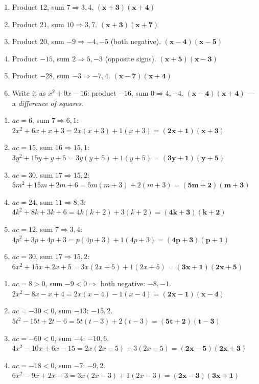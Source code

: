 \documentclass[11pt]{article}
\begin{document}
\begin{anskey}[title={Practice B --- Factoring when $a = 1$}]
\begin{enumerate}[label=\textbf{\arabic*.},leftmargin=2em,itemsep=4pt]
\item Product $12$, sum $7 \Rightarrow 3,4$. \quad $\mathbf{(x+3)(x+4)}$
\item Product $21$, sum $10 \Rightarrow 3,7$. \quad $\mathbf{(x+3)(x+7)}$
\item Product $20$, sum $-9 \Rightarrow -4,-5$ (both negative). \quad $\mathbf{(x-4)(x-5)}$
\item Product $-15$, sum $2 \Rightarrow 5,-3$ (opposite signs). \quad $\mathbf{(x+5)(x-3)}$
\item Product $-28$, sum $-3 \Rightarrow -7,4$. \quad $\mathbf{(x-7)(x+4)}$
\item Write it as $x^2 + 0x - 16$: product $-16$, sum $0 \Rightarrow 4,-4$.
\quad $\mathbf{(x-4)(x+4)}$ --- a \emph{difference of squares}.
\end{enumerate}
\end{anskey}

\begin{anskey}[title={Practice C --- Factoring when $a \neq 1$, All Positive}]
\begin{enumerate}[label=\textbf{\arabic*.},leftmargin=2em,itemsep=5pt]
\item $ac=6$, sum $7 \Rightarrow 6,1$: \ $2x^2+6x+x+3 = 2x(x+3)+1(x+3) = \mathbf{(2x+1)(x+3)}$
\item $ac=15$, sum $16 \Rightarrow 15,1$: \ $3y^2+15y+y+5 = 3y(y+5)+1(y+5) = \mathbf{(3y+1)(y+5)}$
\item $ac=30$, sum $17 \Rightarrow 15,2$: \ $5m^2+15m+2m+6 = 5m(m+3)+2(m+3) = \mathbf{(5m+2)(m+3)}$
\item $ac=24$, sum $11 \Rightarrow 8,3$: \ $4k^2+8k+3k+6 = 4k(k+2)+3(k+2) = \mathbf{(4k+3)(k+2)}$
\item $ac=12$, sum $7 \Rightarrow 3,4$: \ $4p^2+3p+4p+3 = p(4p+3)+1(4p+3) = \mathbf{(4p+3)(p+1)}$
\item $ac=30$, sum $17 \Rightarrow 15,2$: \ $6x^2+15x+2x+5 = 3x(2x+5)+1(2x+5) = \mathbf{(3x+1)(2x+5)}$
\end{enumerate}
\end{anskey}

\begin{anskey}[title={Practice D --- Working with Negative Signs}]
\begin{enumerate}[label=\textbf{\arabic*.},leftmargin=2em,itemsep=5pt]
\item $ac=8>0$, sum $-9<0 \Rightarrow$ both negative: $-8,-1$. \
$2x^2-8x-x+4 = 2x(x-4)-1(x-4) = \mathbf{(2x-1)(x-4)}$
\item $ac=-30<0$, sum $-13$: $-15,2$. \
$5t^2-15t+2t-6 = 5t(t-3)+2(t-3) = \mathbf{(5t+2)(t-3)}$
\item $ac=-60<0$, sum $-4$: $-10,6$. \
$4x^2-10x+6x-15 = 2x(2x-5)+3(2x-5) = \mathbf{(2x-5)(2x+3)}$
\item $ac=-18<0$, sum $-7$: $-9,2$. \
$6x^2-9x+2x-3 = 3x(2x-3)+1(2x-3) = \mathbf{(2x-3)(3x+1)}$
\end{enumerate}
\end{anskey}
\end{document}
